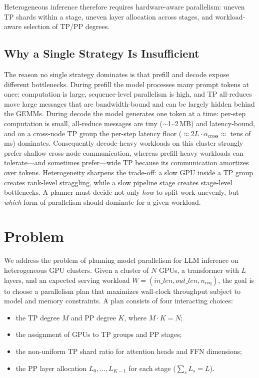 \documentclass[twocolumn]{article}
\begin{document}
Heterogeneous inference therefore requires hardware-aware parallelism: uneven TP shards within a stage, uneven layer allocation across stages, and workload-aware selection of TP/PP degrees.

\subsection{Why a Single Strategy Is Insufficient}

The reason no single strategy dominates is that prefill and decode expose different bottlenecks. During prefill the model processes many prompt tokens at once: computation is large, sequence-level parallelism is high, and TP all-reduces move large messages that are bandwidth-bound and can be largely hidden behind the GEMMs. During decode the model generates one token at a time: per-step computation is small, all-reduce messages are tiny ($\sim$1--2\,MB) and latency-bound, and on a cross-node TP group the per-step latency floor ($\approx\!2L\cdot\alpha_{\text{cross}}\approx$ tens of ms) dominates. Consequently decode-heavy workloads on this cluster strongly prefer shallow cross-node communication, whereas prefill-heavy workloads can tolerate---and sometimes prefer---wide TP because its communication amortizes over tokens. Heterogeneity sharpens the trade-off: a slow GPU inside a TP group creates rank-level straggling, while a slow pipeline stage creates stage-level bottlenecks. A planner must decide not only \emph{how} to split work unevenly, but \emph{which} form of parallelism should dominate for a given workload.

\section{Problem}

We address the problem of planning model parallelism for LLM inference on heterogeneous GPU clusters. Given a cluster of $N$ GPUs, a transformer with $L$ layers, and an expected serving workload $W=(\textit{in\_len}, \textit{out\_len}, n_{\text{req}})$, the goal is to choose a parallelism plan that maximizes wall-clock throughput subject to model and memory constraints. A plan consists of four interacting choices:
\begin{itemize}[leftmargin=*, itemsep=0.15em, topsep=0.2em, parsep=0em]
    \item the TP degree $M$ and PP degree $K$, where $M \cdot K = N$;
    \item the assignment of GPUs to TP groups and PP stages;
    \item the non-uniform TP shard ratio for attention heads and FFN dimensions;
    \item the PP layer allocation $L_0,\dots,L_{K-1}$ for each stage ($\sum_s L_s = L$).
\end{itemize}
\end{document}
